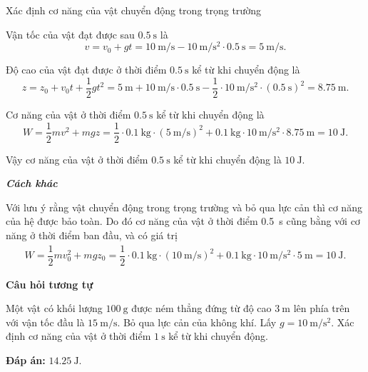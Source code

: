 \begin{dang}{Xác định cơ năng của vật chuyển động trong trọng trường}
{		Vận tốc của vật đạt được sau $\SI{0,5}{\second}$ là
		\begin{equation*}
			v=v_0+gt=\SI{10}{\meter/\second}-\SI{10}{\meter/\second^2}\cdot\SI{0,5}{\second}=\SI{5}{\meter/\second}.
		\end{equation*}
		
		Độ cao của vật đạt được ở thời điểm $\SI{0,5}{\second}$ kể từ khi chuyển động là
		\begin{equation*}
			z=z_0+v_0t+\dfrac{1}{2}gt^2=\SI{5}{\meter}+\SI{10}{\meter/\second}\cdot\SI{0,5}{\second}-\dfrac{1}{2}\cdot\SI{10}{\meter/\second^2}\cdot(\SI{0,5}{\second})^2=\SI{8,75}{\meter}.
		\end{equation*}
		
		Cơ năng của vật ở thời điểm $\SI{0,5}{\second}$ kể từ khi chuyển động là
		\begin{equation*}
			W=\dfrac{1}{2}mv^2+mgz=\dfrac{1}{2}\cdot\SI{0,1}{\kilogram}\cdot(\SI{5}{\meter/\second})^2+\SI{0,1}{\kilogram}\cdot\SI{10}{\meter/\second^2}\cdot\SI{8,75}{\meter}=\SI{10}{\joule}.
		\end{equation*}
		
		Vậy cơ năng của vật ở thời điểm $\SI{0,5}{\second}$ kể từ khi chuyển động là $\SI{10}{\joule}$.
		
		\textbf{\textit{Cách khác}} 
		
		Với lưu ý rằng vật chuyển động trong trọng trường và bỏ qua lực cản thì cơ năng của hệ được bảo toàn. Do đó cơ năng của vật ở thời điểm \SI{0.5}{\second} cũng bằng với cơ năng ở thời điểm ban đầu, và có giá trị 
		\begin{align*}
			W=\dfrac{1}{2}mv_0^2+mgz_0=\dfrac{1}{2}\cdot\SI{0.1}{\kilogram}\cdot(\SI{10}{\meter/\second})^2+\SI{0.1}{\kilogram}\cdot\SI{10}{\meter/\second^2}\cdot\SI{5}{\meter}=\SI{10}{\joule}.
		\end{align*}
		
		\begin{center}
			\textbf{Câu hỏi tương tự}
		\end{center}
		
		Một vật có khối lượng $\SI{100}{\gram}$ được ném thẳng đứng từ độ cao $\SI{3}{\meter}$ lên phía trên với vận tốc đầu là $\SI{15}{\meter/\second}$. Bỏ qua lực cản của không khí. Lấy $g=\SI{10}{\meter/\second^2}$. Xác định cơ năng của vật ở thời điểm $\SI{1}{\second}$ kể từ khi chuyển động.
		
		\textbf{Đáp án:} $\SI{14.25}{\joule}$.
	}
\end{dang}


